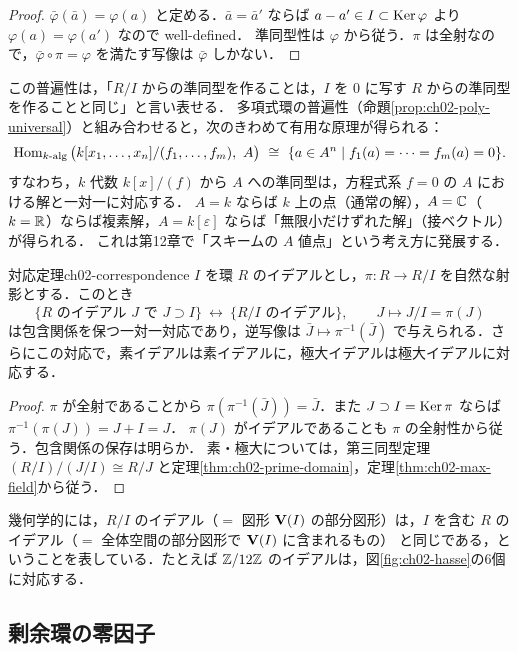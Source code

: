 \begin{proof}
$\bar\varphi(\bar a)=\varphi(a)$ と定める．$\bar a=\bar a'$ ならば $a-a'\in I\subset\operatorname{Ker}\varphi$ より $\varphi(a)=\varphi(a')$ なので well-defined．
準同型性は $\varphi$ から従う．$\pi$ は全射なので，$\bar\varphi\circ\pi=\varphi$ を満たす写像は $\bar\varphi$ しかない．
\end{proof}

この普遍性は，「$R/I$ からの準同型を作ることは，$I$ を $0$ に写す $R$ からの準同型を作ることと同じ」と言い表せる．
多項式環の普遍性（命題\ref{prop:ch02-poly-universal}）と組み合わせると，次のきわめて有用な原理が得られる：
\[
  \Hom_{k\text{-alg}}\big(k[x_1,\dots,x_n]/(f_1,\dots,f_m),\ A\big)
  \ \cong\ \{a\in A^n\mid f_1(a)=\dots=f_m(a)=0\}.
\]
すなわち，$k$ 代数 $k[x]/(f)$ から $A$ への準同型は，方程式系 $f=0$ の $A$ における解と一対一に対応する．
$A=k$ ならば $k$ 上の点（通常の解），$A=\mathbb{C}$（$k=\mathbb{R}$）ならば複素解，$A=k[\varepsilon]$ ならば「無限小だけずれた解」（接ベクトル）が得られる．
これは第12章で「スキームの $A$ 値点」という考え方に発展する．

\begin{mythm}{対応定理}{ch02-correspondence}
$I$ を環 $R$ のイデアルとし，$\pi:R\to R/I$ を自然な射影とする．このとき
\[
  \{R\text{ のイデアル }J\text{ で }J\supset I\}\ \longleftrightarrow\ \{R/I\text{ のイデアル}\},\qquad J\mapsto J/I=\pi(J)
\]
は包含関係を保つ一対一対応であり，逆写像は $\bar J\mapsto\pi^{-1}(\bar J)$ で与えられる．さらにこの対応で，素イデアルは素イデアルに，極大イデアルは極大イデアルに対応する．
\end{mythm}

\begin{proof}
$\pi$ が全射であることから $\pi(\pi^{-1}(\bar J))=\bar J$．また $J\supset I=\operatorname{Ker}\pi$ ならば $\pi^{-1}(\pi(J))=J+I=J$．
$\pi(J)$ がイデアルであることも $\pi$ の全射性から従う．包含関係の保存は明らか．
素・極大については，第三同型定理 $(R/I)/(J/I)\cong R/J$ と定理\ref{thm:ch02-prime-domain}，定理\ref{thm:ch02-max-field}から従う．
\end{proof}

幾何学的には，$R/I$ のイデアル（$=$ 図形 $\mathbf{V}(I)$ の部分図形）は，$I$ を含む $R$ のイデアル（$=$ 全体空間の部分図形で $\mathbf{V}(I)$ に含まれるもの）
と同じである，ということを表している．たとえば $\mathbb{Z}/12\mathbb{Z}$ のイデアルは，図\ref{fig:ch02-hasse}の6個に対応する．

\subsection{剰余環の零因子}

